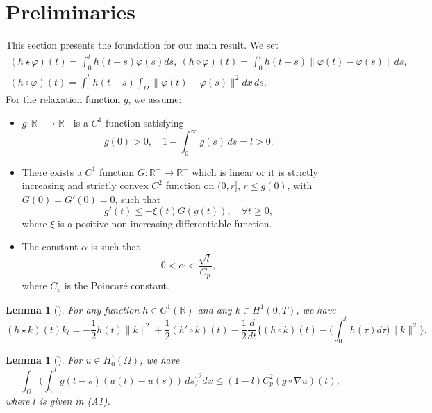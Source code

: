 \documentclass[10pt,a4paper]{amsart}
\numberwithin{equation}{section}
\newtheorem{lemma}[theorem]{Lemma}
\begin{document}
 \section{Preliminaries}

 This section presents the foundation for our main result. We set
 \begin{gather*}
 (h \star \varphi)(t) = \int_0^t h(t-s) \varphi(s)ds,\
 (h \diamond \varphi)(t) = \int_0^t h(t-s)\| \varphi(t)- \varphi(s)\| ds, \\
 (h \circ \varphi)(t) = \int_0^t h(t-s)\int_\Omega\| \varphi(t)- \varphi(s)\|^2 dx \, ds.
 \end{gather*}
 For the relaxation function $g$, we assume:
 \begin{itemize}
\item[(A1)] $g: \mathbb{R}^+ \to \mathbb{R}^+ $ is a $ C^1$ function satisfying\\
\begin{equation*}
 g(0) > 0, \quad 1-\int_0^{\infty} g(s) \, ds = l > 0. \label{e2.1}
\end{equation*}

\item[(A2)] There exists a $C^1$ function $G :\mathbb{R}^+ \to \mathbb{R}^+ $
which is linear or it is strictly increasing and strictly convex $C^2$ function on
$(0, r]$, $r \leq g(0)$, with $G(0) = G'(0) = 0$, such that
\begin{equation} \label{e2.2}
g'(t) \leq -\xi(t) G(g(t)),\quad \forall t \geq 0,
\end{equation}
where $\xi$ is a positive non-increasing differentiable function.

\item[(A3)] The constant $\alpha $ is such that
\begin{equation} \label{e2.3}
0 < \alpha < \frac{\sqrt{l} }{C_p},
\end{equation}
where $C_p$ is the Poincar\'e constant.
\end{itemize}

\begin{lemma}[\cite{Munoz}] \label{lem1}
For any function $h \in C^1 (\mathbb{R})$ and any $k \in H^1 (0,T)$, we have
$$
(h \star k)(t) k_t
 = -\frac{1}{2} h(t)  \| k\|^2 + \frac{1}{2} (h' \circ k)(t)
 -\frac{1}{2} \frac{d}{dt} \Big\{( h \circ k)(t)
 - \Big( \int_0^t h(\tau) d\tau \Big) \|k\|^2 \Big\}.
$$
\end{lemma}

\begin{lemma}[\cite{SMessaoudi1}] \label{lem2}
 For $u \in H^1_0(\Omega)$, we have
\begin{equation}
\int_\Omega \Big( \int_0^t g(t - s)(u(t) - u(s)) \, ds \Big)^2 dx
\leq (1 - l) C_p^2 (g \circ \nabla u)(t),\label{e2.4}
\end{equation}
where $l$ is given in {\rm (A1)}.
\end{lemma}
\end{document}
